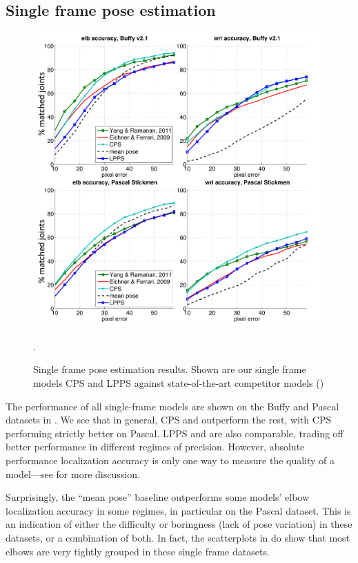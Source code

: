 \subsection{Single frame pose estimation}
\begin{figure}[tb]
\begin{center}
\includegraphics[width=1.00\textwidth]{figs/results-buffy-pascal.pdf}
\caption[Single frame pose estimation results.]{Single frame pose estimation 
results.  Shown are our single frame models CPS and LPPS against 
state-of-the-art competitor models ()}.
\label{fig:results-buffy-pascal}
\end{center}
\end{figure}
The performance of all single-frame models are shown on the Buffy and Pascal 
datasets in .  We see that in general, CPS and 
\citet{deva2011} outperform the rest, with CPS performing strictly better on 
Pascal.  LPPS and \citet{eichner09} are also comparable, trading off better 
performance in different regimes of precision.   However, absolute performance 
localization accuracy is only one way to measure the quality of a model---see 
 for more discussion.

Surprisingly, the ``mean pose'' baseline outperforms some models' elbow 
localization accuracy in some regimes, in particular on the Pascal dataset.  
This is an indication of either the difficulty or boringness (lack of pose 
variation) in these datasets, or a combination of both.  In fact, the 
scatterplots in  do show that most elbows are very 
tightly grouped in these single frame datasets. 

